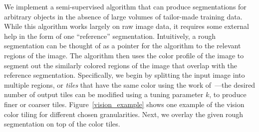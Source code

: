 We implement a semi-supervised algorithm that can produce segmentations for arbitrary objects in the absence of large volumes of tailor-made training data. While this algorithm works largely on raw image data, it requires some external help in the form of one ``reference'' segmentation. Intuitively, a rough segmentation can be thought of as a pointer for the algorithm to the relevant regions of the image. The algorithm then uses the color profile of the image to segment out the similarly colored regions of the image that overlap with the reference segmentation. Specifically, we begin by splitting the input image into multiple regions, or {\em tiles} that have the same color using the work of~\cite{felzenszwalb2004efficient}---the desired number of output tiles can be modified using a tuning parameter $k$, to produce finer or coarser tiles. Figure~\ref{vision_example} shows one example of the vision color tiling for different chosen granularities. Next, we overlay the given rough segmentation on top of the color tiles. 

